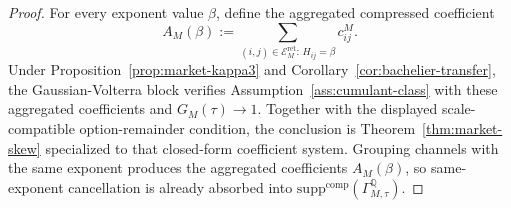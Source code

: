 \documentclass[11pt,a4paper]{amsart}
\theoremstyle{plain}
\theoremstyle{definition}
\theoremstyle{remark}
\newcommand{\QQ}{\mathbb{Q}}
\newcommand{\cE}{\mathcal{E}}
\begin{document}
\begin{proof}
For every exponent value \(\beta\), define the aggregated compressed coefficient
\[
        A_M(\beta)
        :=
        \sum_{(i,j)\in\cE_M^{\mathrm{ret}}:\,H_{ij}=\beta} c_{ij}^M.
\]
Under Proposition~\ref{prop:market-kappa3} and Corollary~\ref{cor:bachelier-transfer}, the
Gaussian-Volterra block verifies Assumption~\ref{ass:cumulant-class} with these aggregated
coefficients and \(G_M(\tau)\to1\).  Together with the displayed scale-compatible
option-remainder condition, the conclusion is Theorem~\ref{thm:market-skew} specialized to that
closed-form coefficient system.  Grouping channels with the same exponent produces the aggregated
coefficients \(A_M(\beta)\), so same-exponent cancellation is already absorbed into
\(\mathrm{supp}^{\mathrm{comp}}(\Gamma_{M,\tau}^\QQ)\).
\end{proof}
\end{document}

